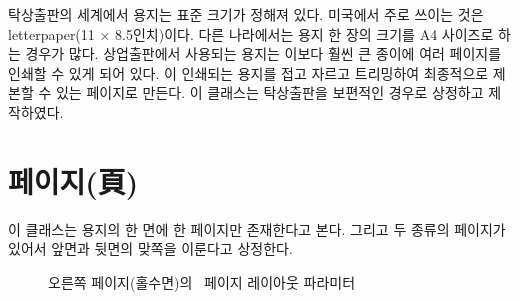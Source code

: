 탁상출판의 세계에서 용지는 표준 크기가 정해져 있다.
미국에서 주로 쓰이는 것은 letterpaper(11 $\times$ 8.5인치)이다.
다른 나라에서는 용지 한 장의 크기를 A4 사이즈로 하는 경우가 많다.
상업출판에서 사용되는 용지는 이보다 훨씬 큰 종이에 여러 페이지를 인쇄할 수
있게 되어 있다.
이 인쇄되는 용지를 접고 자르고 트리밍하여 최종적으로 제본할
수 있는 페이지로 만든다. 이 클래스는 탁상출판을 보편적인 경우로 상정하고
제작하였다.

\section{페이지(頁)}
\label{sec:page}
 
이 클래스는 용지의 한 면에 한 페이지만 존재한다고 본다.
그리고 두 종류의 페이지가 있어서 앞면과 뒷면의 맞쪽을 이룬다고 상정한다.

\begin{figure}
\centering
\drawpage
\caption{오른쪽 페이지(홀수면)의 \ltx\ 페이지 레이아웃 파라미터}
\label{fig:anoddpage}
\end{figure}

